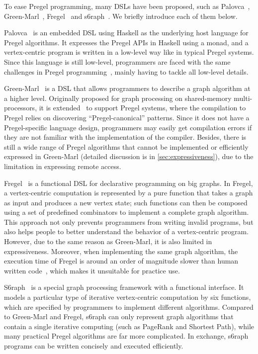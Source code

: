 \documentclass{sokendai_thesis} %
\begin{document}
To ease Pregel programming, many DSLs have been proposed, such as Palovca~\cite{palovca}, Green-Marl~\cite{green14}, Fregel~\cite{fregel} and s6raph~\cite{s6raph}.
We briefly introduce each of them below.

Palovca~\cite{palovca} is an embedded DSL using Haskell as the underlying host language for Pregel algorithms.
It expresses the Pregel APIs in Haskell using a monad, and a vertex-centric program is written in a low-level way like in typical Pregel systems.
Since this language is still low-level, programmers are faced with the same challenges in Pregel programming~\cite{green14, fregel}, mainly having to tackle all low-level details.

Green-Marl~\cite{green12} is a DSL that allows programmers to describe a graph algorithm at a higher level.
Originally proposed for graph processing on shared-memory multi-processors, it is extended~\cite{green14} to support Pregel systems, where the compilation to Pregel relies on discovering ``Pregel-canonical'' patterns.
Since it does not have a Pregel-specific language design, programmers may easily get compilation errors if they are not familiar with the implementation of the compiler.
Besides, there is still a wide range of Pregel algorithms that cannot be implemented or efficiently expressed in Green-Marl (detailed discussion is in \autoref{sec:expressiveness}), due to the limitation in expressing remote access.

Fregel~\cite{fregel} is a functional DSL for declarative programming on big graphs.
In Fregel, a vertex-centric computation is represented by a pure function that takes a graph as input and produces a new vertex state; such functions can then be composed using a set of predefined combinators to implement a complete graph algorithm.
This approach not only prevents programmers from writing invalid programs, but also helps people to better understand the behavior of a vertex-centric program.
However, due to the same reason as Green-Marl, it is also limited in expressiveness.
Moreover, when implementing the same graph algorithm, the execution time of Fregel is around an order of magnitude slower than human written code~\cite{fregel}, which makes it unsuitable for practice use.

S6raph~\cite{s6raph} is a special graph processing framework with a functional interface. It models a particular type of iterative vertex-centric computation by six functions, which are specified by programmers to implement different algorithms.
Compared to Green-Marl and Fregel, s6raph can only represent graph algorithms that contain a single iterative computing (such as PageRank and Shortest Path), while many practical Pregel algorithms are far more complicated.
In exchange, s6raph programs can be written concisely and executed efficiently.
\end{document}
